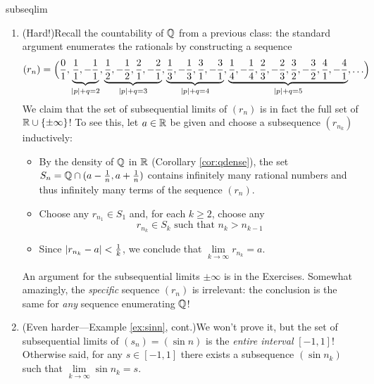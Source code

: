 \begin{examples}{}{subseqlim}
\begin{enumerate}
	\item\label{ex:subseqlim2} (Hard!)\lstsp Recall the countability of $\mathbb{Q}$ from a previous class: the standard argument enumerates the rationals by constructing a sequence
	\[(r_n)=\Bigl(\frac 01,\underbrace{\frac 11,-\frac 11}_{\left| p\right|+q=2}, \underbrace{\frac 12,-\frac 12,\frac 21,-\frac 21}_{\left| p\right|+q=3}, \underbrace{\frac 13,-\frac 13,\frac 31,-\frac 31}_{\left| p\right|+q=4}, \underbrace{\frac 14,-\frac 14,\frac 23,-\frac 23,\frac 32,-\frac 32,\frac 41,-\frac 41}_{\left| p\right|+q=5},\ldots\Bigr)\]
	We claim that the set of subsequential limits of $(r_n)$ is in fact the full set of $\mathbb{R}\cup\{\pm\infty\}$!\smallbreak
	To see this, let $a\in\mathbb{R}$ be given and choose a subsequence $(r_{n_k})$ inductively:
	\begin{itemize}
	  \item By the density of $\mathbb{Q}$ in $\mathbb{R}$ (Corollary \ref{cor:qdense}), the set $S_n=\mathbb{Q}\cap (a-\frac 1n,a+\frac 1n)$ contains infinitely many rational numbers and thus infinitely many terms of the sequence $(r_n)$.
	  \item Choose any $r_{n_1}\in S_1$ and, for each $k\ge 2$, choose any\footnotemark{}
	  \[r_{n_k}\in S_k\text{ \ such that \ }n_k>n_{k-1}\]
	  \item Since $\left| r_{n_k}-a\right|<\frac 1k$, we conclude that $\lim\limits_{k\to\infty}r_{n_k}=a$.
	\end{itemize}
	An argument for the subsequential limits $\pm\infty$ is in the Exercises. Somewhat amazingly, the \emph{specific} sequence $(r_n)$ is irrelevant: the conclusion is the same for \emph{any} sequence enumerating $\mathbb{Q}$!
	
	\item (Even harder---Example \ref{ex:sinn}, cont.)\lstsp We won't prove it, but the set of subsequential limits of $(s_n)=(\sin n)$ is the \emph{entire interval} $[-1,1]$! Otherwise said, for any $s\in[-1,1]$ there exists a subsequence $(\sin n_k)$ such that $\lim\limits_{k\to\infty}\sin n_k=s$.
	

\end{enumerate}
\end{examples}
